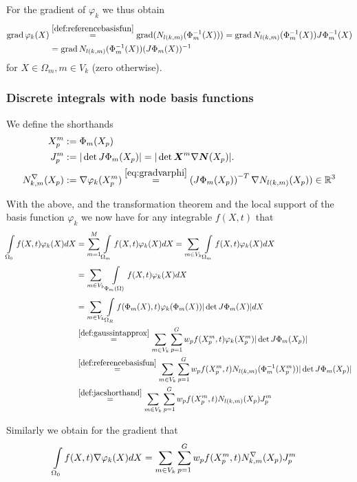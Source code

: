 For the gradient of $\varphi_k$ we thus obtain
\begin{align}
	\grad\varphi_k(X) &\re{def:referencebasisfun} \grad (N_{l(k,m)}(\Phi^{-1}_m(X)))
					  = \grad N_{l(k,m)}(\Phi^{-1}_m(X))J\Phi^{-1}_m(X)\nonumber\\
					  &= \grad N_{l(k,m)}(\Phi^{-1}_m(X))(J\Phi_m(X))^{-1}\label{eq:gradvarphi}
\end{align}
for $X\in\Omega_m, m\in V_k$ (zero otherwise).
 
\subsubsection{Discrete integrals with node basis functions}
We define the shorthands
\begin{align}
	\pmp &:= \Phi_m(X_p)\\
	\jmp &:= |\det J\Phi_m(X_p)| = |\det \vX^m\nabla\vN(X_p)|.\label{def:jacshorthand}\\
	\dNkmp &:= \nabla\varphi_k(\pmp) \re{eq:gradvarphi} \left(J\Phi_m(X_p)\right)^{-T}\nabla \Nkmp)\in\R^3\label{}
\end{align}

With the above, and the transformation theorem and the local support of the basis function $\varphi_k$ we now have for any integrable $f(X,t)$ that
\begin{align}
   \intl{\Or}{}f(X,t)\varphi_k(X)dX &= \suml{m=1}{M}\intl{\Omega_m}{}f(X,t)\varphi_k(X)dX = \sumvk\intl{\Omega_m}{}f(X,t)\varphi_k(X)dX\nonumber\\
    &= \sumvk\intl{\Phi_m(\Omega)}{}f(X,t)\varphi_k(X)dX\nonumber\\
	&= \sumvk\intl{\Om}{}f(\Phi_m(X),t)\varphi_k(\Phi_m(X))|\det J\Phi_m(X)|dX\nonumber\\
	& \re{def:gaussintapprox} \sumvk\sumgp w_pf(\pmp,t)\varphi_k(\pmp)|\det J\Phi_m(X_p)|\nonumber\\
	& \re{def:referencebasisfun} \sumvk\sumgp w_pf(\pmp,t)N_{l(k,m)}(\Phi_m^{-1}(\pmp))|\det J\Phi_m(X_p)|\nonumber\\
	& \re{def:jacshorthand} \sumvk\sumgp w_pf(\pmp,t)\Nkmp\jmp\label{eq:fphidx}
\end{align}

Similarly we obtain for the gradient that
\begin{align}
	\int\limits_{\Omega_0}^{}f(X,t)\nabla\varphi_k(X)dX &= \sum\limits_{m\in V_k}^{}\sum\limits_{p=1}^{G} w_pf(X^m_p,t)N^\nabla_{k,m}(X_p)J^m_p\label{eq:fgradphidx}
\end{align}